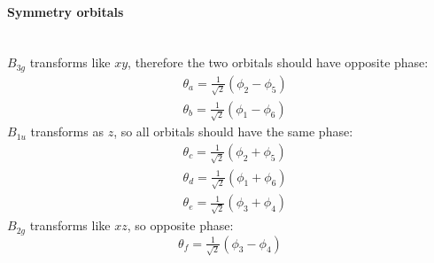 \paragraph{Symmetry orbitals}~\\
$B_{3g}$ transforms like $xy$, therefore the two orbitals should have opposite phase:
\begin{equation}
\begin{aligned}
&\theta_a=\tfrac{1}{\sqrt{2}}(\phi_2-\phi_5)\\
&\theta_b=\tfrac{1}{\sqrt{2}}(\phi_1-\phi_6)
\end{aligned}
\end{equation}
$B_{1u}$ transforms as $z$, so all orbitals should have the same phase:
\begin{equation}
\begin{aligned}
&\theta_c=\tfrac{1}{\sqrt{2}}(\phi_2+\phi_5)\\
&\theta_d=\tfrac{1}{\sqrt{2}}(\phi_1+\phi_6)\\
&\theta_e=\tfrac{1}{\sqrt{2}}(\phi_3+\phi_4)
\end{aligned}
\end{equation}
$B_{2g}$ transforms like $xz$, so opposite phase:
\begin{equation}
	\theta_f=\tfrac{1}{\sqrt{2}}(\phi_3-\phi_4)
\end{equation}
